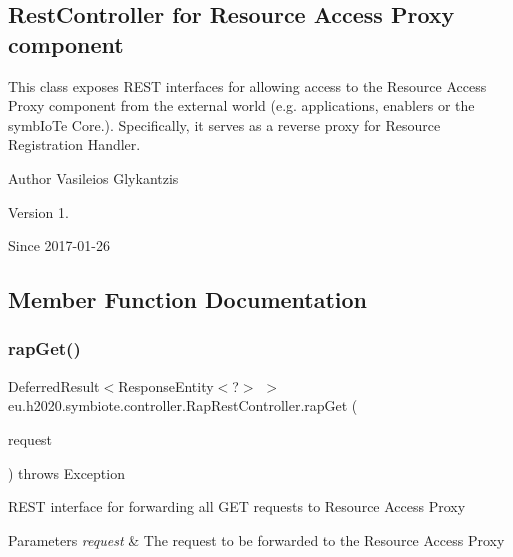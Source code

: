 \subsection*{Rest\+Controller for Resource Access Proxy component}

This class exposes R\+E\+ST interfaces for allowing access to the Resource Access Proxy component from the external world (e.\+g. applications, enablers or the symb\+Io\+Te Core.). Specifically, it serves as a reverse proxy for Resource Registration Handler.

\begin{DoxyAuthor}{Author}
Vasileios Glykantzis 
\end{DoxyAuthor}
\begin{DoxyVersion}{Version}
1. 
\end{DoxyVersion}
\begin{DoxySince}{Since}
2017-\/01-\/26 
\end{DoxySince}


\subsection{Member Function Documentation}
\mbox{\label{classeu_1_1h2020_1_1symbiote_1_1controller_1_1RapRestController_a505d4e7b0a63caeb4343679149422b26}} 
\subsubsection{\texorpdfstring{rap\+Get()}{rapGet()}}
{\footnotesize\ttfamily Deferred\+Result$<$Response\+Entity$<$?$>$ $>$ eu.\+h2020.\+symbiote.\+controller.\+Rap\+Rest\+Controller.\+rap\+Get (\begin{DoxyParamCaption}\item[{Http\+Servlet\+Request}]{request }\end{DoxyParamCaption}) throws Exception}

R\+E\+ST interface for forwarding all G\+ET requests to Resource Access Proxy


\begin{DoxyParams}{Parameters}
{\em request} & The request to be forwarded to the Resource Access Proxy \\
\hline
\end{DoxyParams}
\mbox{\label{classeu_1_1h2020_1_1symbiote_1_1controller_1_1RapRestController_a6c012c973b8b6500acc7c638a53b45a1}} 
